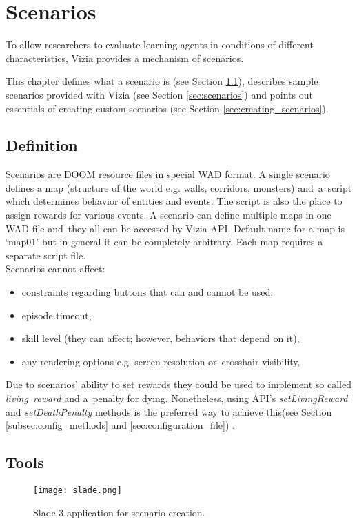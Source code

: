 \chapter{Scenarios}\label{ch:scenarios}

To allow researchers to evaluate learning agents in conditions of different characteristics, Vizia provides a mechanism of scenarios.

This chapter defines what a scenario is (see Section \ref{sec:scenario_definition}), describes sample scenarios provided with Vizia (see Section \ref{sec:scenarios}) and points out essentials of creating custom scenarios (see Section \ref{sec:creating_scenarios}).

\section{Definition}\label{sec:scenario_definition}
	Scenarios are DOOM resource files in special WAD format. A single scenario defines a map (structure of the world e.g. walls, corridors, monsters) and~a~script which determines behavior of entities and events. The script is also the place to assign rewards for various events. A scenario can define multiple maps in one WAD file and~they all can be accessed by Vizia API. Default name for a map is `map01' but in general it can be completely arbitrary. Each map requires a separate script file.
	\\
	Scenarios cannot affect:
	\begin{itemize}
		\item constraints regarding buttons that can and cannot be used,
		\item episode timeout,
		\item skill level (they can affect; however, behaviors that depend on it),
		\item any rendering options e.g. screen resolution or~crosshair visibility,
	\end{itemize}

	Due to scenarios' ability to set rewards they could be used to implement so called \emph{living~reward} and a~penalty for dying. Nonetheless, using API's \emph{setLivingReward} and \emph{setDeathPenalty} methods is the preferred way to achieve this(see Section \ref{subsec:config_methods} and \ref{sec:configuration_file}) .

\section{Tools}\label{sec:tools}
	\begin{figure}
			\centering
			\texttt{[image: slade.png]}
			\caption{Slade 3 application for scenario creation.}\label{fig:slade}
	\end{figure}

